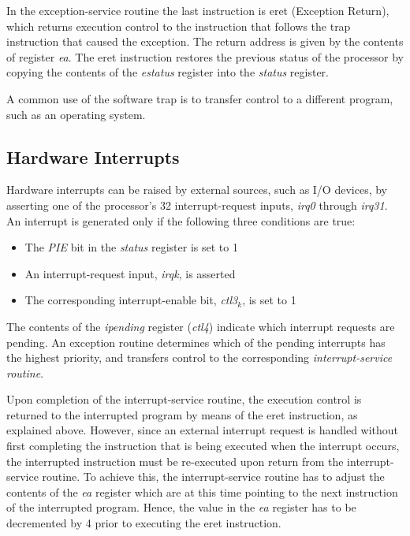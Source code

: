 \documentclass[11pt, twoside, pdftex]{article}
\begin{document}
In the exception-service routine the last instruction is {\sf eret} (Exception Return), 
which returns execution control to the instruction that follows the {\sf trap} 
instruction that caused the exception. The return address is given by the contents
of register {\it ea}. The {\sf eret} instruction restores the
previous status of the processor by copying the contents of the {\it estatus}
register into the {\it status} register. 

A common use of the software trap is to transfer control to a different program,
such as an operating system.

\subsection{Hardware Interrupts}

Hardware interrupts can be raised by external sources, such as I/O devices,
by asserting one of the processor's 32 interrupt-request inputs, {\it irq0}
through {\it irq31}. An interrupt is generated only if the following three
conditions are true:
\begin{itemize}
\item The {\it PIE} bit in the {\it status} register is set to 1
\item An interrupt-request input, {\it irqk}, is asserted
\item The corresponding interrupt-enable bit, {\it ctl3}$_k$, is set to 1
\end{itemize}
\noindent
The contents of the {\it ipending} register ({\it ctl4}) indicate which interrupt 
requests are pending. An exception routine determines which of the 
pending interrupts has the highest priority, and transfers control to the
corresponding {\it interrupt-service routine}.

Upon completion of the interrupt-service routine, the execution control 
is returned to the interrupted program by means of the {\sf eret} instruction,
as explained above. However, since an external interrupt request is handled without
first completing the instruction that is being executed when the interrupt occurs,
the interrupted instruction must be re-executed upon return from the interrupt-service
routine. To achieve this, the interrupt-service routine has to adjust the contents
of the {\it ea} register which are at this time pointing to the next instruction
of the interrupted program. Hence, the value in the {\it ea} register has to be
decremented by 4 prior to executing the {\sf eret} instruction.
\end{document}
